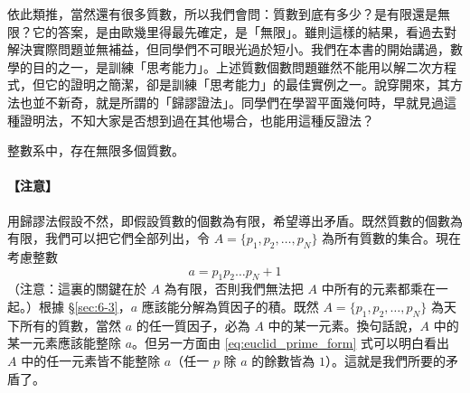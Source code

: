 依此類推，當然還有很多質數，所以我們會問：質數到底有多少？是有限還是無限？它的答案，是由歐幾里得最先確定，是「無限」。雖則這樣的結果，看過去對解決實際問題並無補益，但同學們不可眼光過於短小。我們在本書的開始講過，數學的目的之一，是訓練「思考能力」。上述質數個數問題雖然不能用以解二次方程式，但它的證明之簡潔，卻是訓練「思考能力」的最佳實例之一。說穿開來，其方法也並不新奇，就是所謂的「歸謬證法」。同學們在學習平面幾何時，早就見過這種證明法，不知大家是否想到過在其他場合，也能用這種反證法？

\begin{theorem}\label{thm:infinite_primes}
整數系中，存在無限多個質數。
\end{theorem}

\paragraph{【注意】}
用歸謬法假設不然，即假設質數的個數為有限，希望導出矛盾。既然質數的個數為有限，我們可以把它們全部列出，令 $A = \{p_1, p_2, \dots, p_N\}$ 為所有質數的集合。現在考慮整數
\begin{equation}
  a = p_1 p_2 \dots p_N + 1 \label{eq:euclid_prime_form}
\end{equation}
（注意：這裏的關鍵在於 $A$ 為有限，否則我們無法把 $A$ 中所有的元素都乘在一起。）根據 \S\ref{sec:6-3}，$a$ 應該能分解為質因子的積。既然 $A = \{p_1, p_2, \dots, p_N\}$ 為天下所有的質數，當然 $a$ 的任一質因子，必為 $A$ 中的某一元素。換句話說，$A$ 中的某一元素應該能整除 $a$。但另一方面由 \eqref{eq:euclid_prime_form} 式可以明白看出 $A$ 中的任一元素皆不能整除 $a$（任一 $p$ 除 $a$ 的餘數皆為 $1$）。這就是我們所要的矛盾了。
